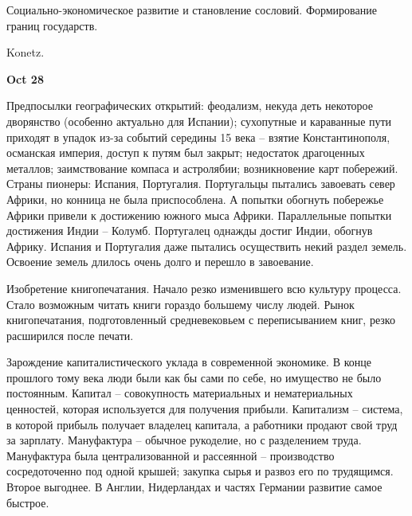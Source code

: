 \documentclass[a4paper, 12pt]{article}
\def\dateis#1{\vspace{\baselineskip}\hfill\textbf{#1}\par}
\begin{document}
\begin{multicols}{2}
Социально-экономическое развитие и становление сословий. Формирование границ государств. 

Konetz.

\dateis{Oct 28}
Предпосылки географических открытий: феодализм, некуда деть некоторое дворянство (особенно актуально для Испании); сухопутные и караванные пути приходят в упадок из-за событий середины 15 века -- взятие Константинополя, османская империя, доступ к путям был закрыт; недостаток драгоценных металлов; заимствование компаса и астролябии; возникновение карт побережий. Страны пионеры: Испания, Португалия. Португальцы пытались завоевать север Африки, но конница не была приспособлена. А попытки обогнуть побережье Африки привели к достижению южного мыса Африки. Параллельные попытки достижения Индии -- Колумб. Португалец однажды достиг Индии, обогнув Африку. Испания и Португалия даже пытались осуществить некий раздел земель. Освоение земель длилось очень долго и перешло в завоевание. 

Изобретение книгопечатания. Начало резко изменившего всю культуру процесса. Стало возможным читать книги гораздо большему числу людей. Рынок книгопечатания, подготовленный средневековьем с переписыванием книг, резко расширился после печати. 

Зарождение капиталистического уклада в современной экономике. В конце прошлого тому века люди были как бы сами по себе, но имущество не было постоянным. Капитал -- совокупность материальных и нематериальных ценностей, которая используется для получения прибыли. Капитализм -- система, в которой прибыль получает владелец капитала, а работники продают свой труд за зарплату. Мануфактура -- обычное рукоделие, но с разделением труда. Мануфактура была централизованной и рассеянной -- производство сосредоточенно под одной крышей; закупка сырья и развоз его по трудящимся. Второе выгоднее. В Англии, Нидерландах и частях Германии развитие самое быстрое. 


\end{multicols}
\end{document}
